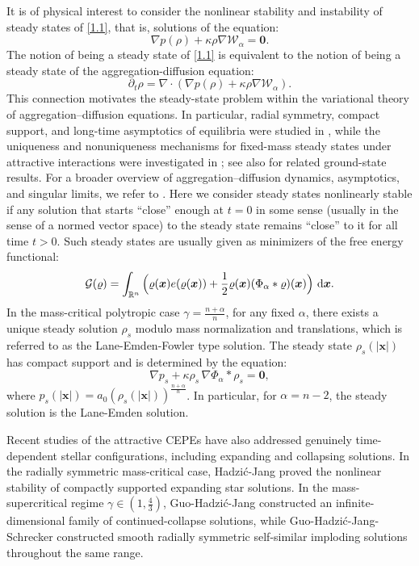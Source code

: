 \documentclass[reqno,11pt]{amsart}
\numberwithin{equation}{section}
\theoremstyle{definition}
\def\dd{{\, \rm d}}
\begin{document}
\smallskip
It is of physical interest to consider the nonlinear stability and instability of 
steady states of \eqref{1.1}, that is, solutions of the equation:
\[
    \nabla p(\rho) + \kappa \rho \nabla \mathcal{W}_\alpha = \boldsymbol{0}.
\]
The notion of being a steady state of \eqref{1.1} is equivalent to the notion of being a steady state 
of the aggregation-diffusion equation:
\[
\partial_t \rho=\nabla\cdot(\nabla p(\rho) + \kappa \rho \nabla \mathcal{W}_\alpha).
\]
This connection motivates the steady-state problem within the variational theory
of aggregation--diffusion equations. In particular, radial symmetry, compact
support, and long-time asymptotics of equilibria were studied in
\cite{Carrillo_2019}, while the uniqueness and nonuniqueness mechanisms for
fixed-mass steady states under attractive interactions were investigated in
\cite{DelgadinoYanYao2022}; see also \cite{Carrillo_2018} for related
ground-state results. For a broader overview of aggregation--diffusion
dynamics, asymptotics, and singular limits, we refer to \cite{CCY19}.
Here we consider steady states nonlinearly stable if any solution that starts ``close'' 
enough at $t=0$ in some sense (usually in the sense of a normed vector space) 
to the steady state remains ``close'' to it for all time $t>0$. 
Such steady states are usually given as minimizers of the free energy functional:
\[
\mathcal{G}(\varrho)=\int_{\mathbb{R}^n} \Big(\varrho(\boldsymbol{x}) e(\varrho(\boldsymbol{x}))+\frac{1}{2}\varrho(\boldsymbol{x})(\Phi_\alpha\ast \varrho)(\boldsymbol{x})\Big)\,\dd\boldsymbol{x}.
\]
In the mass-critical polytropic case $\gamma=\frac{n+\alpha}{n}$, for any fixed $\alpha$, there exists a unique steady solution $\rho_s$ modulo mass normalization and translations, which is referred to as
the Lane-Emden-Fowler type solution. The steady state
$\rho_s(|\boldsymbol{x}|)$ has compact support and is determined by the equation:
\begin{equation*}
\nabla p_s + \kappa \rho_s\,\nabla \Phi_{\alpha} * \rho_s=\boldsymbol{0},
\end{equation*}
where $p_s(|\boldsymbol{x}|)=a_0(\rho_s(|\boldsymbol{x}|))^{\frac{n + \alpha}{n}}$.
In particular, for $\alpha = n-2$, the steady solution is the Lane-Emden solution. 

Recent studies of the attractive CEPEs have also addressed genuinely
time-dependent stellar configurations, including expanding and collapsing
solutions. In the radially symmetric mass-critical case, Hadzi\'c-Jang \cite{HadzicJang2018Stars}
proved the nonlinear stability of compactly supported expanding star
solutions. In the mass-supercritical regime
$\gamma\in(1,\frac{4}{3})$, Guo-Hadzi\'c-Jang \cite{GuoHadzicJang2021} constructed an
infinite-dimensional family of continued-collapse solutions, while Guo-Hadzi\'c-Jang-Schrecker \cite{GuoHadzicJangSchrecker2022}
constructed smooth radially symmetric self-similar imploding solutions
throughout the same range.
\end{document}
